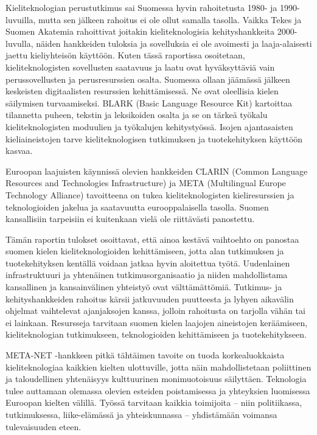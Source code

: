 \documentclass[]{../../metanetpaper}
\begin{document}
\begin{Parallel}[c]{77mm}{77mm}
{Kieliteknologian perustutkimus sai Suomessa hyvin rahoitetusta 1980-
ja 1990-luvuilla, mutta sen jälkeen rahoitus ei ole ollut samalla
tasolla. Vaikka Tekes ja Suomen Akatemia rahoittivat joitakin
kieliteknologisia kehityshankkeita 2000-luvulla, näiden hankkeiden
tuloksia ja sovelluksia ei ole avoimesti ja laaja-alaisesti jaettu
kieliyhteisön käyttöön. Kuten tässä raportissa osoitetaan,
kieliteknologisten sovellusten saatavuus ja laatu ovat hyväksyttäviä
vain perussovellusten ja perusresurssien osalta. Suomessa ollaan
jäämässä jälkeen keskeisten digitaalisten resurssien
kehittämisessä. Ne ovat oleellisia kielen säilymisen
turvaamiseksi. BLARK (Basic Language Resource Kit) kartoittaa
tilannetta puheen, tekstin ja leksikoiden osalta ja se on tärkeä
työkalu kieliteknologisten moduulien ja työkalujen
kehitystyössä. Isojen ajantasaisten kieliaineistojen tarve
kieliteknologisen tutkimuksen ja tuotekehityksen käyttöön kasvaa.

Euroopan laajuisten käynnissä olevien hankkeiden CLARIN (Common
Language Resources and Technologies Infrastructure) ja META
(Multilingual Europe Technology Alliance) tavoitteena on tukea
kieliteknologisten kieliresurssien ja teknologioiden jakelua ja
saatavuutta eurooppalaisella tasolla. Suomen kansallisiin tarpeisiin
ei kuitenkaan vielä ole riittävästi panostettu.

Tämän raportin tulokset osoittavat, että ainoa kestävä vaihtoehto on
panostaa suomen kielen kieliteknologioiden kehittämiseen, jotta alan
tutkimuksen ja tuotekehityksen kentällä voidaan jatkaa hyvin
aloitettua työtä. Uudenlainen infrastruktuuri ja yhtenäinen
tutkimusorganisaatio ja niiden mahdollistama kansallinen ja
kansainvälinen yhteistyö ovat välttämättömiä. Tutkimus- ja
kehityshankkeiden rahoitus kärsii jatkuvuuden puutteesta ja lyhyen
aikavälin ohjelmat vaihtelevat ajanjaksojen kanssa, jolloin rahoitusta
on tarjolla vähän tai ei lainkaan. Resursseja tarvitaan suomen kielen
laajojen aineistojen keräämiseen, kieliteknologian tutkimukseen,
teknologioiden kehittämiseen ja tuotekehitykseen.

META-NET -hankkeen pitkä tähtäimen tavoite on tuoda korkealuokkaista
kieliteknologiaa kaikkien kielten ulottuville, jotta näin
mahdollistetaan poliittinen ja taloudellinen yhtenäisyys kulttuurinen
monimuotoisuus säilyttäen. Teknologia tulee auttamaan olemassa olevien
esteiden poistamisessa ja yhteyksien luomisessa Euroopan kielten
välillä. Työssä tarvitaan kaikkia toimijoita – niin politiikassa,
tutkimuksessa, liike-elämässä ja yhteiskunnassa – yhdistämään voimansa
tulevaisuuden eteen.
}


\end{Parallel}
\end{document}
